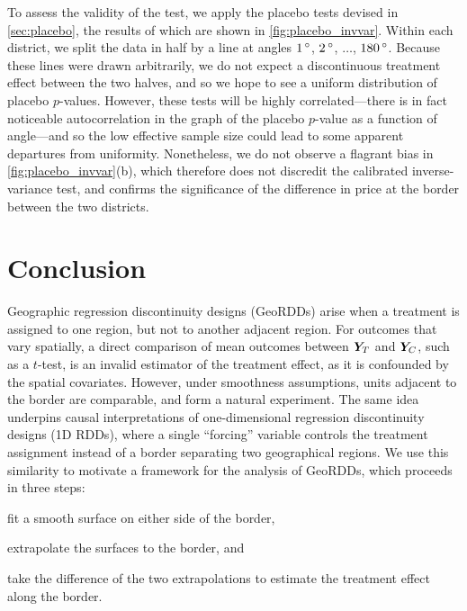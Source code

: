 To assess the validity of the test, we apply the placebo tests devised in \autoref{sec:placebo},
the results of which are shown in \autoref{fig:placebo_invvar}.
Within each district, we split the data in half by a line at angles \(1{\,^\circ}\), \(2{\,^\circ}\), \(\dotsc\), \(180{\,^\circ}\).
Because these lines were drawn arbitrarily, we do not expect a discontinuous treatment effect between the two halves, and so we hope to see a uniform distribution of placebo \(p\)-values.
However, these tests will be highly correlated---there is in fact noticeable autocorrelation in the graph of the placebo \(p\)-value as a function of angle---and so the low effective sample size could lead to some apparent departures from uniformity.
Nonetheless, we do not observe a flagrant bias in \autoref{fig:placebo_invvar}(b), which therefore does not discredit the calibrated inverse-variance test, and confirms the significance of the difference in price at the border between the two districts.

\section{Conclusion}

Geographic regression discontinuity designs (GeoRDDs) arise when a treatment is assigned to one region, but not to another adjacent region.
For outcomes that vary spatially, a direct comparison of mean outcomes between \(\bm{Y}_{T}\) and \(\bm{Y}_{C}\), such as a \(t\)-test, is an invalid estimator of the treatment effect, as it is confounded by the spatial covariates.
However, under smoothness assumptions, units adjacent to the border are comparable, and form a natural experiment.
The same idea underpins causal interpretations of one-dimensional regression discontinuity designs (1D RDDs), where a single ``forcing'' variable controls the treatment assignment instead of a border separating two geographical regions.
We use this similarity to motivate a framework for the analysis of GeoRDDs, which proceeds in three steps:
\begin{flatlist} 
\item fit a smooth surface on either side of the border,
\item extrapolate the surfaces to the border, and 
\item take the difference of the two extrapolations to estimate the treatment effect along the border.
\end{flatlist}


